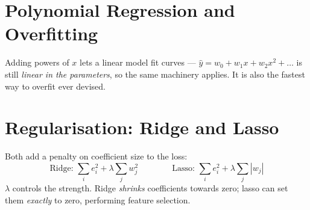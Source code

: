 \section{Polynomial Regression and Overfitting}

Adding powers of $x$ lets a linear model fit curves --- $\hat{y} = w_0 + w_1 x +
w_2 x^2 + \dots$ is still \emph{linear in the parameters}, so the same machinery
applies. It is also the fastest way to overfit ever devised.

\section{Regularisation: Ridge and Lasso}

\begin{definitionbox}
Both add a penalty on coefficient size to the loss:
\[
\text{Ridge: } \sum_i e_i^2 + \lambda \sum_j w_j^2
\qquad\qquad
\text{Lasso: } \sum_i e_i^2 + \lambda \sum_j \left|w_j\right|
\]
$\lambda$ controls the strength. Ridge \emph{shrinks} coefficients towards zero;
lasso can set them \emph{exactly} to zero, performing feature selection.
\end{definitionbox}

